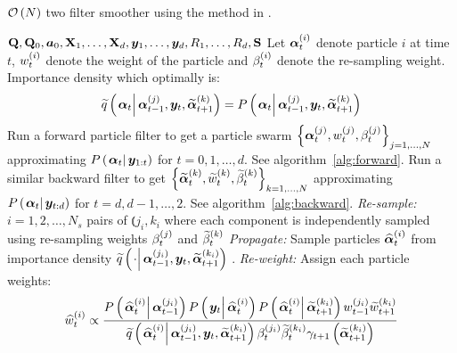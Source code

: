 \begin{algorithm}
\caption{$\mathcal{O}\left( N\right)$ two filter smoother using the method in \cite{fearnhead10}.}\label{alg:ONsmoother}
\begin{algorithmic}[1]\raggedright
\INPUT
\Statex $\mathbf{Q},\mathbf{Q}_0,\bm{a}_0,\mathbf{X}_1,\dots,\mathbf{X}_d,\bm{y}_1,\dots,\bm{y}_d,R_1,\dots,R_d,\mathbf{S}$
%
\Statex Let $\bm{\alpha}_{t}^{\left( i\right)}$ denote particle $i$ at time $t$, $w_{t}^{\left( i\right)}$ denote the weight of the particle and $\beta_{t}^{\left( i\right)}$ denote the re-sampling weight.
%
\Statex Importance density which optimally is: 
\Statex \begin{equation}
	\IDAproxC{\vec{\alpha}_t}{\partic{\vec{\alpha}}{t-1}{j},\vec{y}_t, \particB{\vec{\alpha}}{t+1}{k}} = 
%
	\propC{\vec{\alpha}_t}{\partic{\vec{\alpha}}{t-1}{j},\vec{y}_t, \particB{\vec{\alpha}}{t+1}{k}}
\end{equation}
%
\State Run a forward particle filter to get a particle swarm %
	$\left\{ \bm{\alpha}_{t}^{\left( j\right)}, w_{t}^{\left( j\right)}, \beta_{t}^{\left( j\right)}\right\}_{j=1,\dots,N}$ %
	approximating $\propC{\vec{\alpha}_t}{\vec{y}_{1:t}}$ for $t = 0, 1, \dots, d$. See algorithm~\ref{alg:forward}.
\EndProcedure
%
\State Run a similar backward filter to get %
	$\left\{ \widetilde{\bm{\alpha}}_{t}^{\left( k\right)}, \widetilde{w}_{t}^{\left( k\right)}, \widetilde{\beta}_{t}^{\left( k\right)}\right\}_{k=1,\dots,N}$  %
	approximating $\propC{\vec{\alpha}_t}{\vec{y}_{t:d}}$ for $t = d, d-1, \dots , 2$. See algorithm~\ref{alg:backward}.
\EndProcedure
% 
\StateXX \emph{Re-sample:}
\State $i=1,2,\dots,N_s$ pairs of $\Lparen{j_i, k_i}$ where each component is independently sampled using re-sampling weights $\beta_{t}^{\left( j\right)}$ and $\widetilde{\beta}_{t}^{\left( k\right)}$
%
\StateXX \emph{Propagate:} 
\State Sample particles $\widehat{\bm{\alpha}}_{t}^{\left( i\right)}$ from importance density %
	$\IDAproxC{\cdot}{\partic{\vec{\alpha}}{t-1}{j_i},\vec{y}_t, \particB{\vec{\alpha}}{t + 1}{k_i}}$
.%
\StateXX \emph{Re-weight:}
\State Assign each particle weights:
\StateXX \begin{equation}\label{eqn:combineWeight}
 \particS{w}{t}{i} \propto \frac{
 	\propC{\particS{\vec{\alpha}}{t}{i}}{\partic{\vec{\alpha}}{t - 1}{j_i}}
 	\propC{\vec{y}_t}{\particS{\vec{\alpha}}{t}{i}}
 	\propC{\particS{\vec{\alpha}}{t}{i}}{\particB{\vec{\alpha}}{t + 1}{k_i}}
 	\partic{w}{t - 1}{j_i}\particB{w}{t + 1}{k_i}
 	}{ %
 	\IDAproxC{\particS{\vec{\alpha}}{t}{i}}{\partic{\vec{\alpha}}{t-1}{j_i},\vec{y}_t, \particB{\vec{\alpha}}{t+1}{k_i}}
 	\partic{\beta}{t}{j_i}\particB{\beta}{t}{k_i}\gamma_{t +1}\Lparen{\particB{\vec{\alpha}}{t+1}{k_i}}
 	} %
\end{equation}
\EndFor
\EndProcedure
\end{algorithmic}
\end{algorithm}



